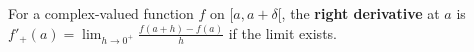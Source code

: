For a complex-valued function $f$ on $[a, a+\delta[$, the \textbf{right derivative} at $a$ is $f'_+(a) = \lim_{h \to 0^+} \frac{f(a+h) - f(a)}{h}$ if the limit exists.
